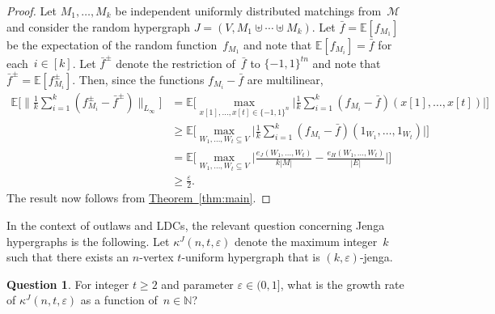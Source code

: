 \documentclass[11pt]{article}
\numberwithin{equation}{section}
\theoremstyle{definition}
\newtheorem{question}[theorem]{Question}
\theoremstyle{plain}
\newcommand{\N}{\mathbb N}
\newcommand{\expref}[2]{\hyperref[#2]{#1~\ref{#2}}}
\newcommand{\pmset}[1]{\{-1,1\}^{#1}} %
\newcommand{\Exp}{{\mathbb{E}}}
\newcommand{\eps}{\varepsilon}
\begin{document}
\begin{proof}
Let $M_1,\dots,M_k$ be independent uniformly distributed matchings from~$\mathcal M$ and consider the random  hypergraph $J = (V, M_1\uplus\cdots\uplus M_k)$.
Let $\bar f = \Exp[f_{M_1}]$ be the expectation of the random function~$f_{M_1}$ and note that $\Exp[f_{M_i}]  = \bar f$ for each~$i\in[k]$.
Let $\bar f^\pm$ denote the restriction of~$\bar f$ to $\pmset{tn}$ and note that $\bar f^\pm = \Exp[f_{M_i}^\pm]$.
Then, since the functions $f_{M_i} - \bar f$ are multilinear,
\begin{align*}
\Exp\Big[
\Big\|
\frac{1}{k}\sum_{i=1}^k (f_{M_i}^\pm - \bar f^\pm)
\Big\|_{L_\infty}
\Big] 
&=
\Exp\Big[
\max_{x[1],\dots,x[t]\in \pmset{n}}\Big|
\frac{1}{k}\sum_{i=1}^k (f_{M_i} - \bar f)(x[1],\dots,x[t])\Big|
\Big]\\ 
&\geq
\Exp\Big[
\max_{W_1,\dots,W_t\subseteq V}
\Big|
\frac{1}{k}\sum_{i=1}^k (f_{M_i} - \bar f)
(1_{W_1},\dots,1_{W_t})
\Big|
\Big]\\
&=
\Exp\Big[
\max_{W_1,\dots,W_t\subseteq V}
\Big|
\frac{e_J(W_1,\dots,W_t)}{k|M|}
-
\frac{e_H(W_1,\dots,W_t)}{|E|}\Big|
\Big]\\
&\geq
\frac{\eps}{2}.
\end{align*}
The result now follows from \expref{Theorem}{thm:main}.
\end{proof}

In the context of outlaws and LDCs, the relevant question concerning Jenga hypergraphs is the following.
Let $\kappa^J(n,t,\eps)$ denote the maximum integer~$k$ such that there exists an $n$-vertex $t$-uniform hypergraph that is $(k,\eps)$-jenga.


\begin{question}\label{prob:jenga}
For integer $t \geq 2$ and parameter $\eps\in (0,1]$, what is the growth rate of $\kappa^J(n,t,\eps)$ as a function of~$n\in\N$?
\end{question}
\end{document}
